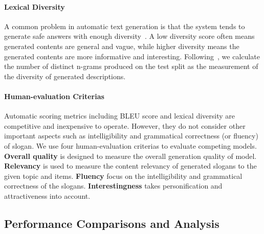 \paragraph{Lexical Diversity}
A common problem in automatic text generation is that the system tends to generate safe
answers with enough diversity~\cite{li2016deep}.
A low diversity score often means generated contents are general and vague, 
while higher diversity means the generated contents are more informative and 
interesting.
Following~\cite{ChenLZYZ019}, we calculate the number of distinct n-grams produced on the test split
as the measurement of the diversity of generated descriptions.

\paragraph{Human-evaluation Criterias}
Automatic scoring metrics including BLEU score and lexical diversity are competitive and inexpensive to operate.
However, they do not consider
other important aspects such as intelligibility and grammatical correctness (or fluency) of slogan.
We use four human-evaluation criterias
to evaluate competing models.
\textbf{Overall quality} is designed to measure the
overall generation quality of model. \textbf{Relevancy} is used to measure the content relevancy of generated slogans to the given topic and items. \textbf{Fluency} focus on the intelligibility and grammatical correctness of the slogans.
\textbf{Interestingness} takes personification and attractiveness into account. 


\subsection{Performance Comparisons and Analysis}
\label{sec:results}




